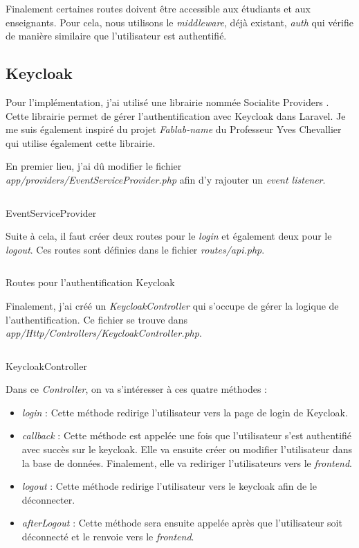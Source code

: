 Finalement certaines routes doivent être accessible aux étudiants et aux enseignants. Pour cela, nous utilisons le \emph{middleware}, déjà existant, \emph{auth} qui vérifie de manière similaire que l'utilisateur est authentifié.

\subsection{Keycloak}
Pour l'implémentation, j'ai utilisé une librairie nommée Socialite Providers \cite{SocialiteProviders}. Cette librairie permet de gérer l'authentification avec Keycloak dans Laravel. Je me suis également inspiré du projet \emph{Fablab-name} \cite{FablabName} du Professeur Yves Chevallier qui utilise également cette librairie.

En premier lieu, j'ai dû modifier le fichier \emph{app/providers/EventServiceProvider.php} afin d'y rajouter un \emph{event listener}.
\begin{listing}[H]
    \inputminted{php}{assets/code/serviceProviderkeycloak.php}
    \caption{EventServiceProvider \label{serviceProviderkeycloak}}
\end{listing}

Suite à cela, il faut créer deux routes pour le \emph{login} et également deux pour le \emph{logout}. Ces routes sont définies dans le fichier \emph{routes/api.php}.

\begin{listing}[H]
    \inputminted{php}{assets/code/routeKeycloak.php}
    \caption{Routes pour l'authentification Keycloak \label{routeKeycloak}}
\end{listing}

Finalement, j'ai créé un \emph{KeycloakController} qui s'occupe de gérer la logique de l'authentification. Ce fichier se trouve dans \emph{app/Http/Controllers/KeycloakController.php}.

\begin{listing}[H]
    \inputminted{php}{assets/code/keycloakController.php}
    \caption{KeycloakController \label{keycloakController}}
\end{listing}

Dans ce \emph{Controller}, on va s'intéresser à ces quatre méthodes :
\begin{itemize}
    \item \emph{login} : Cette méthode redirige l'utilisateur vers la page de login de Keycloak.
    \item \emph{callback} : Cette méthode est appelée une fois que l'utilisateur s'est authentifié avec succès sur le keycloak. Elle va ensuite créer ou modifier l'utilisateur dans la base de données. Finalement, elle va rediriger l'utilisateurs vers le \emph{frontend}.
    \item \emph{logout} : Cette méthode redirige l'utilisateur vers le keycloak afin de le déconnecter.
    \item \emph{afterLogout} : Cette méthode sera ensuite appelée après que l'utilisateur soit déconnecté et le renvoie vers le \emph{frontend}.
\end{itemize}

